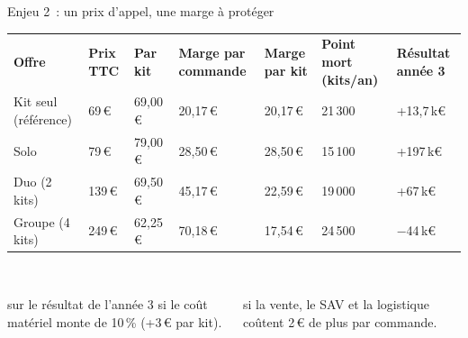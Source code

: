 \begin{frame}{Enjeu 2~: un prix d'appel, une marge à protéger}
  \footnotesize\renewcommand{\arraystretch}{1.3}
   
  \setlength{\tabcolsep}{3pt}
  \noindent\begin{tabular}{@{}>{\raggedright\arraybackslash}p{2.9cm}NNNNNN@{}}
    \textcolor{insarouge}{\bfseries Offre} & \textcolor{insarouge}{\bfseries Prix TTC} & \textcolor{insarouge}{\bfseries Par kit} & \textcolor{insarouge}{\bfseries Marge par commande} & \textcolor{insarouge}{\bfseries Marge par kit} & \textcolor{insarouge}{\bfseries Point mort (kits/an)} & \textcolor{insarouge}{\bfseries Résultat année 3}\\
    Kit seul (référence)    & 69\,€  & 69,00\,€ & 20,17\,€ & 20,17\,€ & 21\,300 & +13,7\,k€\\
    Solo                    & 79\,€  & 79,00\,€ & 28,50\,€ & 28,50\,€ & 15\,100 & +197\,k€\\
    Duo (2 kits)           & 139\,€ & 69,50\,€ & 45,17\,€ & 22,59\,€ & 19\,000 & +67\,k€\\
    Groupe (4 kits)         & 249\,€ & 62,25\,€ & 70,18\,€ & 17,54\,€ & 24\,500 & −44\,k€\\
  \end{tabular}
  \vspace{0.12cm}
  \begin{columns}[T]
    \begin{column}{0.325\textwidth}
      \begin{carte}[height=1.7cm,valign=top]
        \raggedright{}\\[1pt]{\footnotesize sur le résultat de l'année 3 si le coût matériel monte de 10\,\% (+3\,€ par kit).}
      \end{carte}
    \end{column}
    \begin{column}{0.325\textwidth}
      \begin{carte}[height=1.7cm,valign=top]
        \raggedright{}\\[1pt]{\footnotesize si la vente, le SAV et la logistique coûtent 2\,€ de plus par commande.}
      \end{carte}
    \end{column}
    \begin{column}{0.325\textwidth}
      \begin{carte}[height=1.7cm,valign=top]

\end{carte}
\end{column}
\end{columns}
\end{frame}
